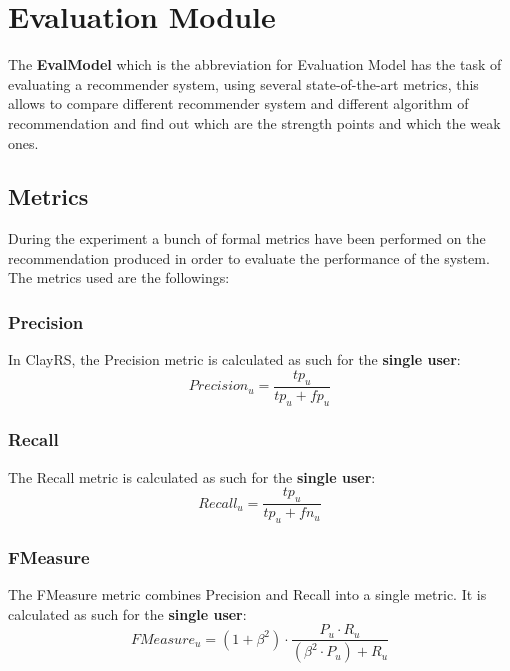 \documentclass[11pt]{article}
\begin{document}
\section{Evaluation Module}\label{sec:eva-module}
The \textbf{EvalModel} which is the abbreviation for Evaluation Model has the task of evaluating a recommender system,
using several state-of-the-art metrics, this allows to compare different recommender system and different algorithm of
recommendation and find out which are the strength points and which the weak ones.

\subsection{Metrics}\label{subsec:metrics}
During the experiment a bunch of formal metrics have been performed on the recommendation produced in order to evaluate
the performance of the system.
The metrics used are the followings:
\hfill\break
\hfill\break

\subsubsection{Precision}\label{subsubsec:precision}
In ClayRS, the Precision metric is calculated as such for the \textbf{single user}:
\hfill\break
\hfill\break
    \[
         Precision_u = \frac{tp_u}{tp_u + fp_u}
    \]


\subsubsection{Recall}\label{subsubsec:recall}
The Recall metric is calculated as such for the \textbf{single user}:
\hfill\break
\hfill\break
    \[
        Recall_u = \frac{tp_u}{tp_u + fn_u}
    \]


\subsubsection{FMeasure}\label{subsubsec:f-meas}
The FMeasure metric combines Precision and Recall into a single metric.
It is calculated as such for the \textbf{single user}:
\hfill\break
\hfill\break
    \[
        FMeasure_u = (1 + \beta^2) \cdot \frac{P_u \cdot R_u}{(\beta^2 \cdot P_u) + R_u}
    \]
\end{document}
